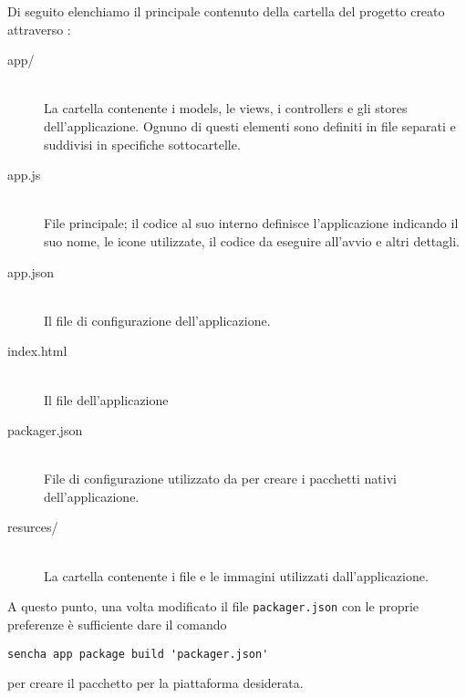 			Di seguito elenchiamo il principale contenuto della cartella del
			progetto creato attraverso \senchacmd{}:
			\begin{description}
				\item[app/]\hfill \\
					La cartella contenente i models, le views, i controllers e
					gli stores dell'applicazione. Ognuno di questi elementi sono
					definiti in file \js{} separati e suddivisi in specifiche
					sottocartelle.
				\item[app.js]\hfill \\
					File \js{} principale; il codice al suo interno definisce
					l'applicazione indicando il suo nome, le icone utilizzate,
					il codice da eseguire all'avvio e altri	dettagli. 
				\item[app.json]\hfill \\
					Il file di configurazione dell'applicazione.
				\item[index.html]\hfill \\
					Il file \html{} dell'applicazione
				\item[packager.json]\hfill \\
					File di configurazione utilizzato da \senchacmd{} per creare
					i pacchetti nativi dell'applicazione.
				\item[resurces/]\hfill \\
					La cartella contenente i file \css{} e le immagini utilizzati
					dall'applicazione.
			\end{description}
			A questo punto, una volta modificato il file \verb|packager.json| con
			le proprie preferenze è sufficiente dare il comando
			\begin{lstlisting}[language=MyBash]
	sencha app package build 'packager.json'
			\end{lstlisting}
			per creare il pacchetto per la piattaforma desiderata.
			
